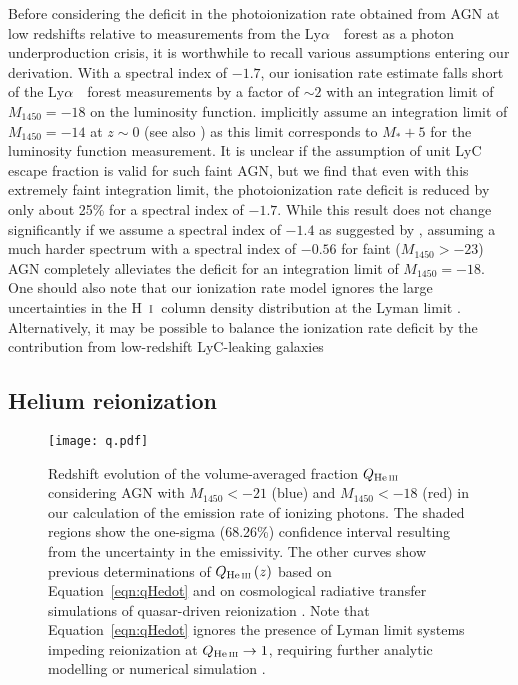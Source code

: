 \documentclass[fleqn,usenatbib]{mnras}
\def\lya{Ly$\alpha$~}
\def\HI{\hbox{H~$\scriptstyle\rm I$}}
\begin{document}
Before considering the deficit in the photoionization rate obtained
from AGN at low redshifts relative to measurements from the
\lya\ forest as a photon underproduction crisis, it is worthwhile to
recall various assumptions entering our derivation.  With a spectral
index of $-1.7$, our ionisation rate estimate falls short of the
\lya\ forest measurements by a factor of $\sim 2$ with an integration
limit of $M_{1450}=-18$ on the luminosity function.
\citet{2015ApJ...813L...8M} implicitly assume an integration limit of
$M_{1450}=-14$ at $z\sim 0$ (see also \citealt{2015MNRAS.451L..30K,
  2018arXiv180104931P}) as this limit corresponds to $M_*+5$ for the
\citet{2009A&A...507..781S} luminosity function measurement.  It is
unclear if the assumption of unit LyC escape fraction is valid for
such faint AGN, but we find that even with this extremely faint
integration limit, the photoionization rate deficit is reduced by only
about 25\% for a spectral index of $-1.7$.  While this result does not
change significantly if we assume a spectral index of $-1.4$ as
suggested by \citet{2014ApJ...794...75S}, assuming a much harder
spectrum with a spectral index of $-0.56$ \citep{2004ApJ...615..135S}
for faint ($M_{1450}>-23$) AGN completely alleviates the deficit for
an integration limit of $M_{1450}=-18$.  One should also note that our
ionization rate model ignores the large uncertainties in the
\HI\ column density distribution at the Lyman limit
\citep{2011ApJ...736...42R, 2017ApJ...849..106S, 2017MNRAS.466..838G}.
Alternatively, it may be possible to balance the ionization rate
deficit by the contribution from low-redshift LyC-leaking galaxies
\citep{2016Natur.529..178I, 2018MNRAS.474.4514I, 2018MNRAS.478.4851I}

\subsection{Helium reionization}

\begin{figure}
  \begin{center}
    \texttt{[image: q.pdf]}
  \end{center}
  \caption{Redshift evolution of the volume-averaged 
    fraction $Q_\ion{He}{iii}$ considering AGN with $M_{1450}<-21$
    (blue) and $M_{1450}<-18$ (red) in our calculation of the emission
    rate of ionizing photons.  The shaded regions show the one-sigma
    (68.26\%) confidence interval resulting from the uncertainty in
    the emissivity.  The other curves show previous determinations of
    $Q_\ion{He}{iii}\left(z\right)$ based on
    Equation~\eqref{eqn:qHedot} \citep{2012ApJ...746..125H,
      2015ApJ...813L...8M, 2016ApJ...828...90L, 2018arXiv180104931P}
    and on cosmological radiative transfer simulations of
    quasar-driven  reionization
    \citep{2009ApJ...694..842M, 2014MNRAS.445.4186C}.  Note that
    Equation~\eqref{eqn:qHedot} ignores the presence of 
    Lyman limit systems impeding reionization at
    $Q_\ion{He}{iii}\rightarrow 1$, requiring further analytic
    modelling \citep{2017ApJ...851...50M} or numerical simulation
    \citep{2018arXiv180104931P}.
  \label{fig:qhe}}  
\end{figure}
\end{document}
